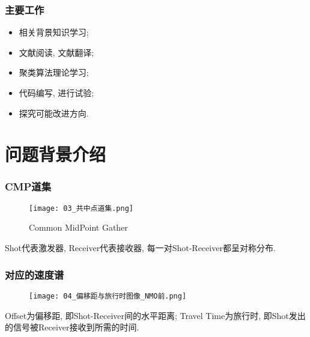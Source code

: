 \documentclass[11pt, professionalfonts]{beamer}
\begin{document}
{
\maketitle

\begin{frame}[c]
    \frametitle{主要工作}
    \begin{itemize}
        \item 相关背景知识学习; 
        \vspace{10pt}\item 文献阅读, 文献翻译; 
        \vspace{10pt}\item 聚类算法理论学习; 
        \vspace{10pt}\item 代码编写, 进行试验; 
        \vspace{10pt}\item 探究可能改进方向. 
    \end{itemize}
\end{frame}

\section{问题背景介绍}

\begin{frame}[c]
    \frametitle{CMP道集}
    \begin{minipage}{.55\paperwidth}
        \begin{figure}[h]
            \centering
            \texttt{[image: 03\_共中点道集.png]}
            \caption{Common MidPoint Gather}
        \end{figure}
    \end{minipage}
    \begin{minipage}{.35\paperwidth}
        Shot代表激发器, Receiver代表接收器, 每一对Shot-Receiver都呈对称分布. 
    \end{minipage}
\end{frame}

\begin{frame}[c]
    \frametitle{对应的速度谱}
    \begin{minipage}{.55\paperwidth}
        \begin{figure}[h]
            \centering
            \texttt{[image: 04\_偏移距与旅行时图像\_NMO前.png]}
        \end{figure}
    \end{minipage}
    \begin{minipage}{.35\paperwidth}
        Offset为偏移距, 即Shot-Receiver间的水平距离; Travel Time为旅行时, 即Shot发出的信号被Receiver接收到所需的时间. 
    \end{minipage}
\end{frame}

}
\end{document}
